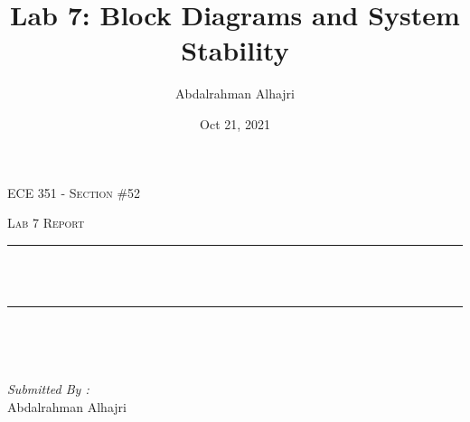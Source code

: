 \documentclass[12pt]{report}
\title{Lab 7: Block Diagrams and System Stability}
\author{ Abdalrahman Alhajri}
\date{Oct 21, 2021}
\makeatletter
\let\thetitle\@title
\makeatother
\begin{document}

\begin{titlepage}
	\centering
    \vspace*{0.5 cm}
\begin{center}    \textsc{\Large   ECE 351 - Section \#52 }\\[2.0 cm]	\end{center}%
	\textsc{\Large Lab 7 Report }\\[0.5 cm]				%
	\rule{\linewidth}{0.2 mm} \\[0.4 cm]
	{ \huge \bfseries \thetitle}\\
	\rule{\linewidth}{0.2 mm} \\[1.5 cm]
	
	\begin{minipage}{0.4\textwidth}
		\begin{flushleft} \large
			\end{flushleft}
			\end{minipage}~
			\begin{minipage}{0.4\textwidth}
            
			\begin{flushright} \large
			\emph{Submitted By :} \\
			Abdalrahman Alhajri  
		\end{flushright}
           
	\end{minipage}\\[2 cm]
	
    
    
    
    
	
\end{titlepage}


\tableofcontents
\pagebreak

\renewcommand{\thesection}{\arabic{section}}
\end{document}
